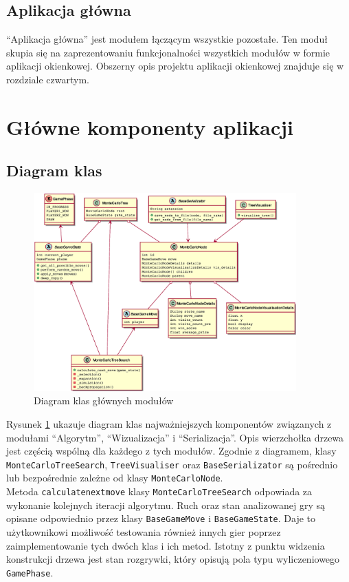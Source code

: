 \documentclass{article}
\let\oldsection\section
\renewcommand\section{\clearpage\oldsection}
\newcommand{\code}[1]{\colorbox{light-gray}{\texttt{#1}}}
\begin{document}
	\subsection{Aplikacja główna}
	``Aplikacja główna'' jest modułem łączącym wszystkie pozostałe. Ten moduł skupia się na zaprezentowaniu funkcjonalności wszystkich modułów w formie aplikacji okienkowej. Obszerny opis projektu aplikacji okienkowej znajduje się w rozdziale czwartym.
	
	\section{Główne komponenty aplikacji}
	\subsection{Diagram klas}
	\begin{figure}[h]
		\centering
		\includegraphics[width=0.9\textwidth]{umldiagram}
		\caption{Diagram klas głównych modułów}
		\label{rys:umldiagrammain}
	\end{figure}
	
	\noindent Rysunek \ref{rys:umldiagrammain} ukazuje diagram klas najważniejszych komponentów związanych z modułami ``Algorytm'', ``Wizualizacja'' i ``Serializacja''. Opis wierzchołka drzewa jest częścią wspólną dla każdego z tych modułów. Zgodnie z diagramem, klasy \code{MonteCarloTreeSearch}, \code{TreeVisualiser} oraz \code{BaseSerializator} są pośrednio lub bezpośrednie zależne od klasy \code{MonteCarloNode}. \\
	
	\noindent Metoda \code{calculate\textunderscore next\textunderscore move} klasy \code{MonteCarloTreeSearch} odpowiada za wykonanie kolejnych iteracji algorytmu. Ruch oraz stan analizowanej gry są opisane odpowiednio przez klasy \code{BaseGameMove} i \code{BaseGameState}. Daje to użytkownikowi możliwość testowania również innych gier poprzez zaimplementowanie tych dwóch klas i ich metod. Istotny z punktu widzenia konstrukcji drzewa jest stan rozgrywki, który opisują pola typu wyliczeniowego \code{GamePhase}. \\
	
\end{document}
